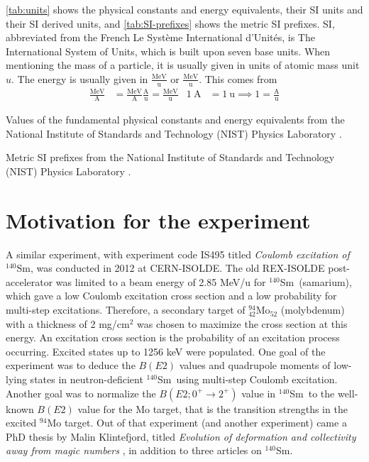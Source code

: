 \documentclass[twoside,english]{uiofysmaster/uiofysmaster}
\newcommand{\Sm}{$^{140}$Sm} %
\let\orgautoref\autoref
\renewcommand{\autoref}
        {%
		 \def\sectionautorefname{Section}%
		 \def\subsectionautorefname{Section}%
		 \def\subsubsectionautorefname{Section}%
		 \def\chapterautorefname{Chapter}%
          \orgautoref}
\begin{document}
\autoref{tab:units} shows the physical constants and energy equivalents, their SI units and their SI derived units, and
\autoref{tab:SI-prefixes} shows the metric SI prefixes.
SI, abbreviated from the French Le Syst{\`{e}}me International d'Unit{\'{e}}s, is The International System of Units, which is built upon seven base units.
When mentioning the mass of a particle, it is usually given in units of atomic mass unit $u$.
The energy is usually given in $\frac{\text{MeV}}{\text{u}}$ or $\frac{\text{MeV}}{\text{u}}$.
This comes from 
\begin{align}
	\frac{\text{MeV}}{\text{A}} &= \frac{\text{MeV}}{\text{A}}  \frac{\text{A}}{\text{u}} = \frac{\text{MeV}}{\text{u}}  &  1 ~\text{A} &= 1 ~\text{u} \implies 1 = \frac{\text{A}}{\text{u}}
\end{align}

\begin{table}[htb] 
    \centering 
    \caption{Values of the fundamental physical constants and energy equivalents from the National Institute of Standards and Technology (NIST) Physics Laboratory \cite{units}.}
	
	\label{tab:units}
\end{table}

\begin{table}[htb] 
    \centering 
    \caption{Metric SI prefixes from the National Institute of Standards and Technology (NIST) Physics Laboratory \cite{units}.}
	
	\label{tab:SI-prefixes}
\end{table}


\section{Motivation for the experiment}

A similar experiment, with experiment code IS495 titled \textit{Coulomb excitation of} \Sm, was conducted in 2012 at CERN-ISOLDE.
The old REX-ISOLDE post-accelerator was limited to a beam energy of 2.85 MeV/u for \Sm\ (samarium), which gave a low Coulomb excitation cross section and a low probability for multi-step excitations. 
Therefore, a secondary target of $^{94}_{42}$Mo$_{52}$ (molybdenum) with a thickness of 2 mg/cm$^2$ was chosen to maximize the cross section at this energy.
An excitation cross section is the probability of an excitation process occurring.
Excited states up to 1256 keV were populated.
One goal of the experiment was to deduce the $B(E2)$ values and quadrupole moments of low-lying states in neutron-deficient \Sm\ using multi-step Coulomb excitation.
Another goal was to normalize the $B(E2; 0^+ \rightarrow 2^+)$ value in \Sm\ to the well-known $B(E2)$ value for the Mo target, that is the transition strengths in the excited $^{94}$Mo target.
Out of that experiment (and another experiment) came a PhD thesis by Malin Klintefjord, titled \textit{Evolution of deformation and collectivity away from magic numbers} \cite{Klintefjord}, in addition to three articles \cite{Klintefjord2015, Samorajczyk2015, Klintefjord2016} on \Sm.
\end{document}
